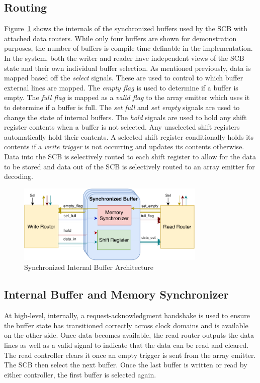     \subsection{Routing}
        Figure~\ref{fig:sb_arch} shows the internals of the synchronized buffers used by the SCB with attached data routers. While only four buffers are shown for demonstration purposes, the number of buffers is compile-time definable in the implementation. In the system, both the writer and reader have independent views of the SCB state and their own individual buffer selection. As mentioned previously, data is mapped based off the {\it select} signals. These are used to control to which buffer external lines are mapped. The {\it empty flag} is used to determine if a buffer is empty. The {\it full flag} is mapped as a {\it valid flag} to the array emitter which uses it to determine if a buffer is full. The {\it set full} and {\it set empty} signals are used to change the state of internal buffers. The {\it hold} signals are used to hold any shift register contents when a buffer is not selected. Any unselected shift registers automatically hold their contents. A selected shift register conditionally holds its contents if a {\it write trigger} is not occurring and updates its contents otherwise. Data into the SCB is selectively routed to each shift register to allow for the data to be stored and data out of the SCB is selectively routed to an array emitter for decoding.

        \begin{figure}
            \centering
            \includegraphics[width=0.8\textwidth]{fig/pdp_sb_arch.pdf}
            \caption{Synchronized Internal Buffer Architecture}
            \label{fig:sb_arch}
        \end{figure}

    \subsection{Internal Buffer and Memory Synchronizer}
        \label{sec:memorysync}
        At high-level, internally, a request-acknowledgment handshake is used to ensure the buffer state has transitioned correctly across clock domains and is available on the other side. Once data becomes available, the read router outputs the data lines as well as a valid signal to indicate that the data can be read and cleared. The read controller clears it once an empty trigger is sent from the array emitter. The SCB then select the next buffer. Once the last buffer is written or read by either controller, the first buffer is selected again.

